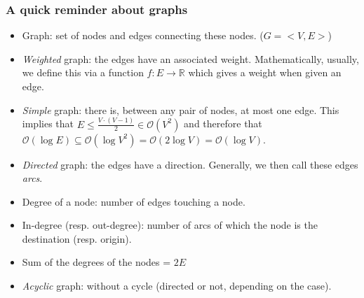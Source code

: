 \documentclass[8pt,aspectratio=169]{beamer}
\begin{document}
\begin{frame}
\frametitle{A quick reminder about graphs}
\begin{itemize}
	\item Graph: set of nodes and edges connecting these nodes. ($G=<V,E>$)
	\item \textit{Weighted} graph: the edges have an associated weight. Mathematically, usually, we define this via a function $f: E \rightarrow \mathbb{R}$ which gives a weight when given an edge.
	\item \textit{Simple} graph: there is, between any pair of nodes, at most one edge. This implies that $E \leq \frac{V\cdot(V-1)}{2} \in \mathcal{O}(V^2)$ and therefore that $\mathcal{O}(\log E) \subseteq \mathcal{O}(\log V^2) = \mathcal{O}(2 \log V) = \mathcal{O}(\log V)$.
	\item \textit{Directed} graph: the edges have a direction. Generally, we then call these edges \textit{arcs}.
	\item Degree of a node: number of edges touching a node.
	\item In-degree (resp. out-degree): number of arcs of which the node is the destination (resp. origin).
	\item Sum of the degrees of the nodes = $2E$
	\item \textit{Acyclic} graph: without a cycle (directed or not, depending on the case).
\end{itemize}
\end{frame}
\end{document}
